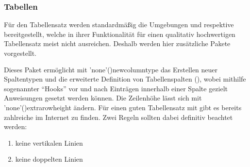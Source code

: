 \subsubsection{%
  Tabellen%
}

Für den Tabellensatz werden standardmäßig die Umgebungen  
und  respektive  bereitgestellt, 
welche in ihrer Funktionalität für einen qualitativ hochwertigen Tabellensatz 
meist nicht ausreichen. Deshalb werden hier zusätzliche Pakete vorgestellt. 

\begin{DeclarePackages}[Tabellen|?]
  Dieses Paket ermöglicht mit \Macro'none'(){newcolumntype} das 
  Erstellen neuer Spaltentypen und die erweiterte Definition von Tabellenspalten
  (\PValue{>\MPValue{\dots}}\PValue{<\MPValue{\dots}}), 
  wobei mithilfe sogenannter \enquote{Hooks} vor und nach Einträgen innerhalb 
  einer Spalte gezielt Anweisungen gesetzt werden können. Die Zeilenhöhe lässt 
  sich mit \Macro'none'(){extrarowheight} ändern. 
  Für einen guten Tabellensatz mit  gibt es bereits zahlreiche 
   im 
  Internet zu finden. Zwei Regeln sollten dabei definitiv beachtet werden:
  \begin{enumerate}[itemindent=0pt,labelwidth=*,labelsep=1em,label=\Roman*.]
  \item keine vertikalen Linien
  \item keine doppelten Linien
  \end{enumerate}
  

\end{DeclarePackages}
